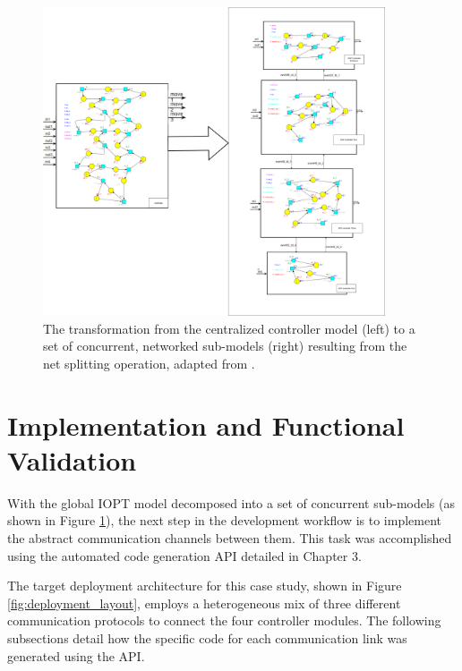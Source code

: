 \begin{figure}[htb]
    \centering
    \includegraphics[width=0.9\textwidth]{Chapters/Figures/controller_decomposition.png}
\caption{The transformation from the centralized controller model (left) to a set of concurrent, networked sub-models (right) resulting from the net splitting operation, adapted from \cite{tavaresgomes2026}.}
    \label{fig:decomposed_model}
\end{figure}


\section{Implementation and Functional Validation}
\label{sec:use_case_implementation}

With the global IOPT model decomposed into a set of concurrent sub-models (as shown in Figure \ref{fig:decomposed_model}), the next step in the development workflow is to implement the abstract communication channels between them. This task was accomplished using the automated code generation API detailed in Chapter 3.

The target deployment architecture for this case study, shown in Figure \ref{fig:deployment_layout}, employs a heterogeneous mix of three different communication protocols to connect the four controller modules. The following subsections detail how the specific code for each communication link was generated using the API.


